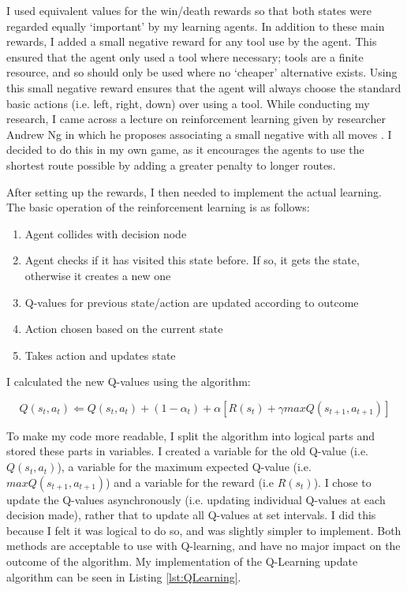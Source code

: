 \documentclass[a4paper,oneside]{report}
\begin{document}
I used equivalent values for the win/death rewards so that both states were regarded equally `important' by my learning agents. In addition to these main rewards, I added a small negative reward for any tool use by the agent. This ensured that the agent only used a tool where necessary; tools are a finite resource, and so should only be used where no `cheaper' alternative exists. Using this small negative reward ensures that the agent will always choose the standard basic actions (i.e. left, right, down) over using a tool. While conducting my research, I came across a lecture on reinforcement learning given by researcher Andrew Ng in which he proposes associating a small negative with all moves \cite{Ng:uq}. I decided to do this in my own game, as it encourages the agents to use the shortest route possible by adding a greater penalty to longer routes.

After setting up the rewards, I then needed to implement the actual learning. The basic operation of the reinforcement learning is as follows:

\begin{enumerate}
	\item Agent collides with decision node
	\item Agent checks if it has visited this state before. If so, it gets the state, otherwise it creates a new one
	\item Q-values for previous state/action are updated according to outcome
	\item Action chosen based on the current state
	\item Takes action and updates state
\end{enumerate}

I calculated the new Q-values using the algorithm: 

\begin{equation*}
Q(s_t,a_t) \Leftarrow Q(s_t, a_t) + (1 -\alpha_t) + \alpha[R(s_t) + \gamma max Q(s_{t+1}, a_{t+1})] 
\end{equation*}

To make my code more readable, I split the algorithm into logical parts and stored these parts in variables. I created a variable for the old Q-value (i.e. $Q(s_t, a_t)$), a variable for the maximum expected Q-value (i.e. $max Q(s_{t+1}, a_{t+1})$) and a variable for the reward (i.e $R(s_t)$). I chose to update the Q-values asynchronously (i.e. updating individual Q-values at each decision made), rather that to update all Q-values at set intervals. I did this because I felt it was logical to do so, and was slightly simpler to implement. Both methods are acceptable to use with Q-learning, and have no major impact on the outcome of the algorithm. My implementation of the Q-Learning update algorithm can be seen in Listing \ref{lst:QLearning}.
\end{document}
